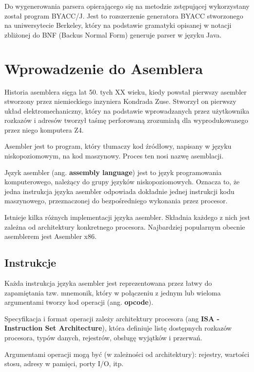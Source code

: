 \documentclass[a4paper,12pt]{article}
\begin{document}
Do wygenerowania parsera opierającego się na metodzie zstępującej wykorzystany został program BYACC/J\citep{byaccj}. Jest to rozszerzenie generatora BYACC stworzonego na uniwersytecie Berkeley\cite{byacc}, który na podstawie gramatyki opisanej w notacji zbliżonej do BNF (Backus Normal Form)\cite{BNF} generuje parser w języku Java.

\newpage

\section{Wprowadzenie do Asemblera}

Historia asemblera sięga lat 50. tych XX wieku, kiedy powstał pierwszy asembler stworzony przez niemieckiego inzyniera Kondrada Zuse. Stworzył on pierwszy układ elektromechaniczny, który na podstawie wprowadzanych przez użytkownika rozkazów i adresów tworzył taśmę perforowaną zrozumiałą dla wyprodukowanego przez niego komputera Z4.

Asembler jest to program, który tłumaczy kod źródłowy, napisany w języku niskopoziomowym, na kod maszynowy. Proces ten nosi nazwę asemblacji. 

Język asembler (ang. \textbf{assembly language}) jest to język programowania komputerowego, należący do grupy języków niskopoziomowych. Oznacza to, że jedna instrukcja języka asembler odpowiada dokładnie jednej instrukcji kodu maszynowego, przeznaczonej do bezpośredniego wykonania przez procesor.

Istnieje kilka różnych implementacji języka asembler. Składnia każdego z nich jest zależna od architektury konkretnego procesora. Najbardziej popularnym obecnie asemblerem jest Asembler x86.

\subsection{Instrukcje}

Każda instrukcja języka asembler jest reprezentowana przez łatwy do zapamiętania tzw. mnemonik, który w połączeniu z jednym lub wieloma argumentami tworzy kod operacji (ang. \textbf{opcode}).

Specyfikacja i format operacji zależy architektury procesora (ang \textbf{ISA - Instruction Set Architecture}), która definiuje listę dostępnych rozkazów procesora, typów danych, rejestrów, obsługę wyjątków i przerwań.

Argumentami operacji mogą być (w zależności od architektury): rejestry, wartości stosu, adresy w pamięci, porty I/O, itp.
\end{document}
